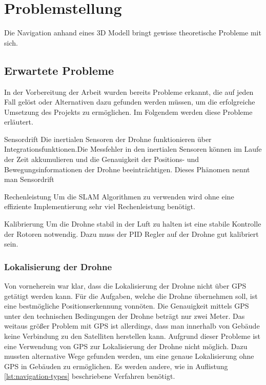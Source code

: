 \chapter{Problemstellung}

Die Navigation anhand eines 3D Modell bringt gewisse theoretische Probleme mit sich.





\section{Erwartete Probleme} \label{erwartete_probleme:section}

In der Vorbereitung der Arbeit wurden bereits Probleme erkannt, die auf jeden Fall gelöst oder Alternativen dazu gefunden werden müssen, um die erfolgreiche Umsetzung des Projekts zu ermöglichen. Im Folgendem werden diese Probleme erläutert.

\begin{description}
    \item{Sensordrift} Die inertialen Sensoren der Drohne funktionieren über Integrationsfunktionen.Die Messfehler in den inertialen Sensoren können im Laufe der Zeit akkumulieren und die Genauigkeit der Positions- und Bewegungsinformationen der Drohne beeinträchtigen. Dieses Phänomen nennt man Sensordrift
    \item{Rechenleistung} Um die \ac{SLAM} Algorithmen zu verwenden wird ohne eine effiziente Implementierung sehr viel Rechenleistung benötigt.
    \item{Kalibrierung} Um die Drohne stabil in der Luft zu halten ist eine stabile Kontrolle der Rotoren notwendig. Dazu muss der \ac{PID} Regler auf der Drohne gut kalibriert sein.
\end{description}

\subsection{Lokalisierung der Drohne} \label{lokalisierung_der_drohne:subsection}

Von vorneherein war klar, dass die Lokalisierung der Drohne nicht über \ac{GPS} getätigt werden kann. Für die Aufgaben, welche die Drohne übernehmen soll, ist eine bestmögliche Positionserkennung vonnöten. Die Genauigkeit mittels \ac{GPS} unter den technischen Bedingungen der Drohne beträgt nur zwei Meter. Das weitaus größer Problem mit \ac{GPS} ist allerdings, dass man innerhalb von Gebäude keine Verbindung zu den Satelliten herstellen kann. Aufgrund dieser Probleme ist eine Verwendung von \ac{GPS} zur Lokalisierung der Drohne nicht möglich. Dazu mussten alternative Wege gefunden werden, um eine genaue Lokalisierung ohne \ac{GPS} in Gebäuden zu ermöglichen. Es werden andere, wie in Auflistung \ref{lst:navigation-types} beschriebene Verfahren benötigt.

